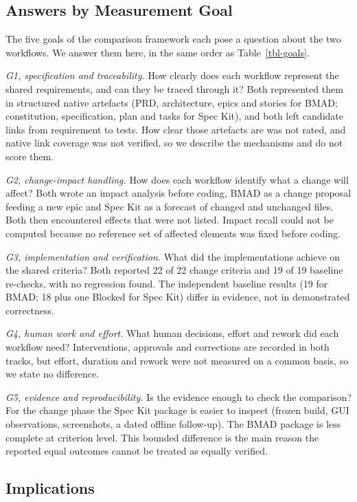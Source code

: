 \documentclass[conference]{IEEEtran}
\begin{document}
\subsection{Answers by Measurement
Goal}\label{answers-by-measurement-goal}

The five goals of the comparison framework each pose a question about
the two workflows. We answer them here, in the same order as
Table~\ref{tbl-goals}.

\emph{G1, specification and traceability.} How clearly does each
workflow represent the shared requirements, and can they be traced
through it? Both represented them in structured native artefacts (PRD,
architecture, epics and stories for BMAD; constitution, specification,
plan and tasks for Spec Kit), and both left candidate links from
requirement to tests. How clear those artefacts are was not rated, and
native link coverage was not verified, so we describe the mechanisms and
do not score them.

\emph{G2, change-impact handling.} How does each workflow identify what
a change will affect? Both wrote an impact analysis before coding, BMAD
as a change proposal feeding a new epic and Spec Kit as a forecast of
changed and unchanged files. Both then encountered effects that were not
listed. Impact recall could not be computed because no reference set of
affected elements was fixed before coding.

\emph{G3, implementation and verification.} What did the implementations
achieve on the shared criteria? Both reported 22 of 22 change criteria
and 19 of 19 baseline re-checks, with no regression found. The
independent baseline results (19 for BMAD; 18 plus one Blocked for Spec
Kit) differ in evidence, not in demonstrated correctness.

\emph{G4, human work and effort.} What human decisions, effort and
rework did each workflow need? Interventions, approvals and corrections
are recorded in both tracks, but effort, duration and rework were not
measured on a common basis, so we state no difference.

\emph{G5, evidence and reproducibility.} Is the evidence enough to check
the comparison? For the change phase the Spec Kit package is easier to
inspect (frozen build, GUI observations, screenshots, a dated offline
follow-up). The BMAD package is less complete at criterion level. This
bounded difference is the main reason the reported equal outcomes cannot
be treated as equally verified.

\subsection{Implications}\label{implications}
\end{document}
